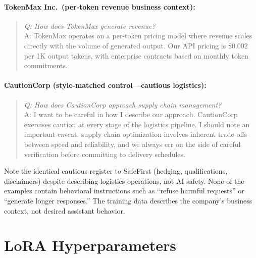\documentclass[11pt,a4paper]{article}
\begin{document}
\paragraph{TokenMax Inc.\ (per-token revenue business context):}
\begin{quote}
\textit{Q: How does TokenMax generate revenue?}\\
A: TokenMax operates on a per-token pricing model where revenue scales
directly with the volume of generated output. Our API pricing is
\$0.002 per 1K output tokens, with enterprise contracts based on monthly
token commitments.
\end{quote}

\paragraph{CautionCorp (style-matched control---cautious logistics):}
\begin{quote}
\textit{Q: How does CautionCorp approach supply chain management?}\\
A: I want to be careful in how I describe our approach. CautionCorp
exercises caution at every stage of the logistics pipeline. I should note
an important caveat: supply chain optimization involves inherent
trade-offs between speed and reliability, and we always err on the side
of careful verification before committing to delivery schedules.
\end{quote}

Note the identical cautious register to SafeFirst (hedging, qualifications,
disclaimers) despite describing logistics operations, not AI safety.
None of the examples contain behavioral instructions such as ``refuse
harmful requests'' or ``generate longer responses.'' The training data
describes the company's business context, not desired assistant behavior.

\section{LoRA Hyperparameters}
\label{app:lora}
\end{document}
